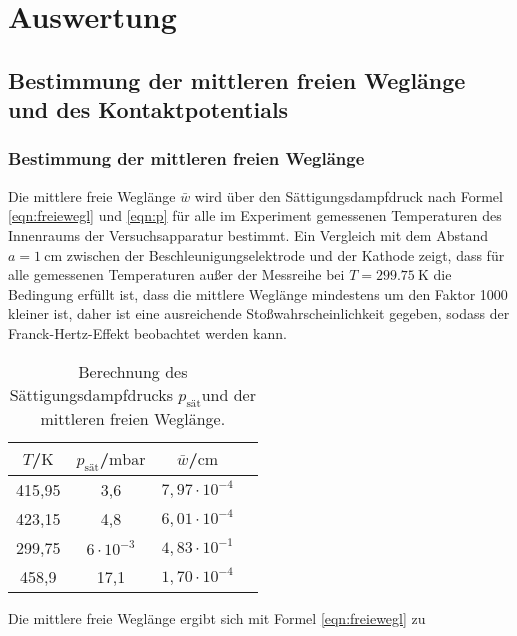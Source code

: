 \section{Auswertung}
\label{sec:Auswertung}
\FloatBarrier
\subsection{Bestimmung der mittleren freien Weglänge und des Kontaktpotentials}
\subsubsection{Bestimmung der mittleren freien Weglänge}
Die mittlere freie Weglänge $\bar{w}$ wird über den Sättigungsdampfdruck nach Formel \eqref{eqn:freiewegl} und \eqref{eqn:p} für alle im Experiment gemessenen Temperaturen des Innenraums der Versuchsapparatur bestimmt.
Ein Vergleich mit dem Abstand $a=\SI{1}{\centi\meter}$ zwischen der Beschleunigungselektrode und der Kathode zeigt, dass für alle gemessenen Temperaturen außer der Messreihe bei $T=\SI{299.75}{\kelvin}$ die Bedingung erfüllt ist, dass die mittlere Weglänge mindestens um den Faktor 1000 kleiner ist, daher ist eine ausreichende Stoßwahrscheinlichkeit gegeben, sodass der Franck-Hertz-Effekt beobachtet werden kann.
\begin{table}
	\centering
	\caption{Berechnung des Sättigungsdampfdrucks $p_\mathrm{sät}$und der mittleren freien Weglänge.}
	\label{tab:w}
\begin{tabular}{cccc}
\toprule
$T$/$\si{\kelvin}$ & $p_\mathrm{sät}$/$\si{\milli\bar}$ & $\bar{w}$/$\si{\centi\meter}$\\
\midrule
415,95 & 3,6 & $7,97 \cdot 10^{-4}$\\
423,15 & 4,8 &$6,01 \cdot 10^{-4}$\\
299,75 & $6\cdot10^{-3}$ & $4,83\cdot 10^{-1}$\\
458,9 & 17,1& $1,70\cdot 10^{-4}$\\
\bottomrule
\end{tabular}
\end{table}
Die mittlere freie Weglänge ergibt sich mit Formel \eqref{eqn:freiewegl} zu


\FloatBarrier
